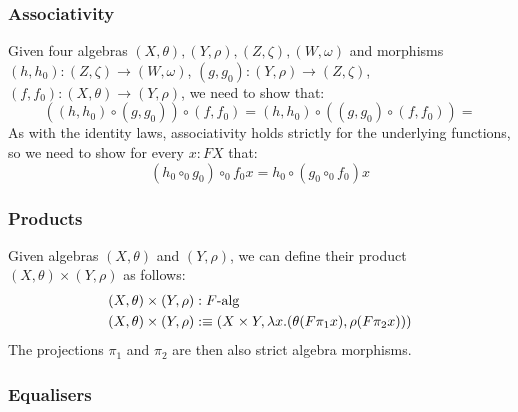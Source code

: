 \documentclass[a4paper,10pt]{article}
\begin{document}
\subsubsection{Associativity}

Given four algebras $(X,\theta), (Y,\rho), (Z,\zeta), (W,\omega)$ and
morphisms $(h,h_0) : (Z,\zeta) \to (W,\omega)$,
$(g,g_0) : (Y,\rho) \to (Z,\zeta)$,
$(f,f_0) : (X,\theta) \to (Y,\rho)$, we need to show that:
$$
((h,h_0) \circ (g,g_0)) \circ (f,f_0) = (h,h_0) \circ ((g,g_0) \circ (f,f_0)) = 
$$
As with the identity laws, associativity holds strictly for the
underlying functions, so we need to show for every $x : FX$ that:
$$
(h_0 \circ_0 g_0) \circ_0 f_0 x = h_0 \circ (g_0 \circ_0 f_0) x
$$


\subsubsection{Products}

Given algebras $(X,\theta)$ and $(Y,\rho)$, we can define their
product $(X,\theta) \times (Y,\rho)$ as follows:
%
\begin{align*}
  &(X,\theta) \times (Y,\rho) : F\mbox{-alg}\\
  &(X,\theta) \times (Y,\rho) :\equiv (X \times Y , \lambda x . (\theta (F \pi_1 x) , \rho (F \pi_2 x)))
\end{align*}
%
The projections $\pi_1$ and $\pi_2$ are then also strict algebra morphisms.

\subsubsection{Equalisers}
\end{document}
